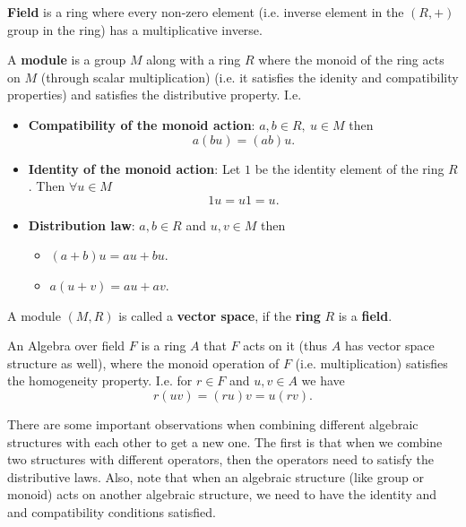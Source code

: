 \begin{remark}
	\textbf{Field} is a ring where every non-zero element (i.e. inverse element in the $ (R,+) $ group in the ring) has a multiplicative inverse.
\end{remark}

\begin{definition}
	A \textbf{module} is a group $ M $ along with a ring $ R $ where the monoid of the ring acts on $ M $ (through scalar multiplication) (i.e. it satisfies the idenity and compatibility properties) and satisfies the distributive property. I.e.
	\begin{itemize}
		\item \textbf{Compatibility of the monoid action}: $ a,b \in R,\ u \in M $ then 
		\[ a(bu) = (ab)u. \]
		\item \textbf{Identity of the monoid action}: Let $ 1 $ be the identity element of the ring $ R $. Then $ \forall u \in M $
		\[1u = u1 = u. \]
		\item \textbf{Distribution law}: $ a,b \in R $ and $ u,v \in M $ then
		\begin{itemize}
			\item $ (a+b)u = au + bu $.
			\item $ a(u+v) = au + av $.
		\end{itemize}
	\end{itemize}
\end{definition}
\begin{remark}
	A module $ (M,R) $ is called a \textbf{vector space}, if the \textbf{ring} $ R $ is a \textbf{field}.
\end{remark}

\begin{definition}
	\label{def:algebra}
	An Algebra over field $ F $ is a ring $ A $ that $ F $ acts on it (thus $ A $ has vector space structure as well), where the monoid operation of $ F $ (i.e. multiplication) satisfies the homogeneity property. I.e. for $ r \in F $ and $ u,v \in A $ we have
	\[ r(uv) = (ru)v = u (rv). \]
\end{definition}

There are some important observations when combining different algebraic structures with each other to get a new one. The first is that when we combine two structures with different operators, then the operators need to satisfy the distributive laws. Also, note that when an algebraic structure (like group or monoid) acts on another algebraic structure, we need to have the identity and and compatibility conditions satisfied.

